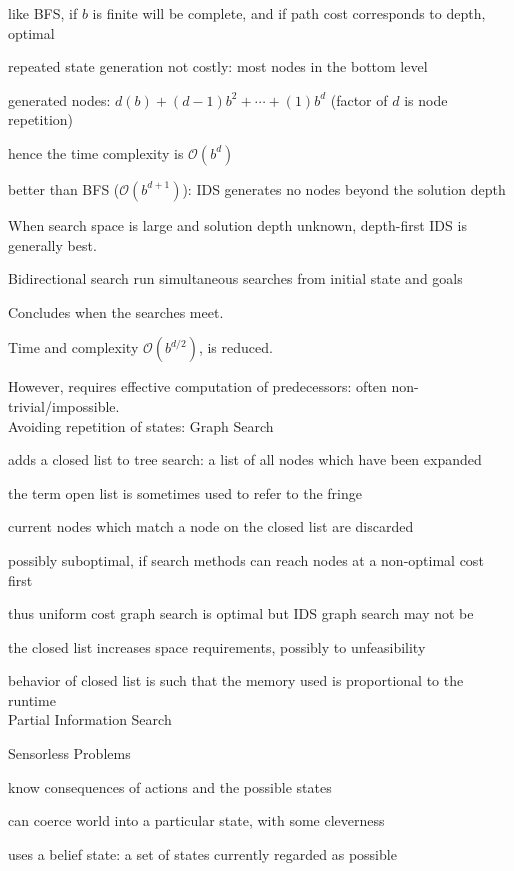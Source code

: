 \documentclass[12pt]{article}
\begin{document}
like BFS, if $b$ is finite will be complete, and if path cost corresponds to depth, optimal

repeated state generation not costly: most nodes in the bottom level

generated nodes: $d(b) + (d - 1)b^2 + \cdots + (1)b^d$ (factor of $d$ is node repetition)

hence the time complexity is $\mathcal{O}(b^d)$

better than BFS ($\mathcal{O}(b^{d+1})$): IDS generates no nodes beyond the solution depth

\noindent
When search space is large and solution depth unknown, depth-first IDS is generally best.

\noindent
Bidirectional search run simultaneous searches from initial state and goals

Concludes when the searches meet.

Time and complexity $\mathcal{O}(b^{d/2})$, is reduced.

However, requires effective computation of predecessors: often non-trivial/impossible.\\

\noindent
Avoiding repetition of states: Graph Search

adds a closed list to tree search: a list of all nodes which have been expanded

the term open list is sometimes used to refer to the fringe

current nodes which match a node on the closed list are discarded

possibly suboptimal, if search methods can reach nodes at a non-optimal cost first

thus uniform cost graph search is optimal but IDS graph search may not be

the closed list increases space requirements, possibly to unfeasibility

behavior of closed list is such that the memory used is proportional to the runtime\\

\noindent
Partial Information Search

\noindent
Sensorless Problems

know consequences of actions and the possible states

can coerce world into a particular state, with some cleverness

uses a belief state: a set of states currently regarded as possible
\end{document}
